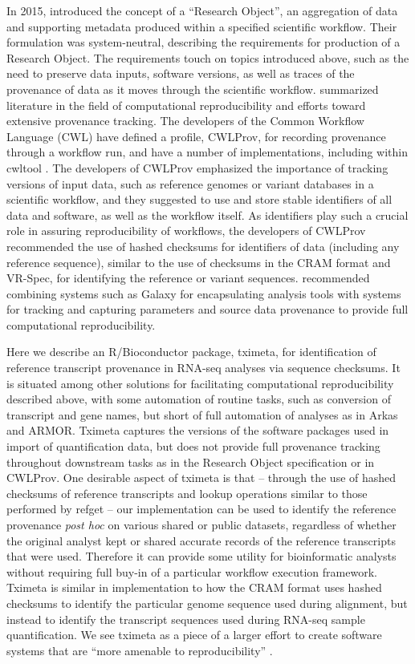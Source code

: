 \documentclass[12pt]{article} \usepackage[utf8]{inputenc}
\begin{document}
In 2015, \citet{Belhajjame2015} introduced the concept of a ``Research
Object'', an aggregation of data and supporting metadata produced
within a specified scientific workflow. Their formulation was
system-neutral, describing the requirements for production of a
Research Object. The requirements touch on topics introduced above,
such as the need to preserve data inputs, software versions, as well
as traces of the provenance of data as it moves through the scientific
workflow. \citet{Belhajjame2015} summarized literature in the field of
computational reproducibility and efforts toward extensive provenance
tracking. The developers of the Common Workflow Language (CWL) \citep{cwl}
have defined a profile, CWLProv, for recording provenance through a
workflow run, and have a number of implementations, including within
cwltool \citep{Khan2018}. The developers of CWLProv emphasized the
importance of tracking versions of input data, such as reference
genomes or variant databases in a scientific workflow, and they
suggested to use and store stable identifiers of all data and software,
as well as the workflow itself. As identifiers play such a crucial
role in assuring reproducibility of workflows, the developers of
CWLProv recommended the use of hashed checksums for identifiers of data
(including any reference sequence), similar to the use of checksums in
the CRAM format and VR-Spec, for identifying the reference or variant
sequences. \citet{Gruning2018} recommended combining systems such as
Galaxy for encapsulating analysis tools with systems for tracking and
capturing parameters and source data provenance to provide full
computational reproducibility.

Here we describe an R/Bioconductor package, tximeta, for identification
of reference transcript provenance in RNA-seq analyses via sequence
checksums. It is situated among other solutions for facilitating
computational reproducibility described above, with some automation of
routine tasks, such as conversion of transcript and gene names, but
short of full automation of analyses as in Arkas and ARMOR. Tximeta
captures the versions of the software packages used in import of
quantification data, but does not provide full provenance tracking
throughout downstream tasks as in the Research Object specification or
in CWLProv. One desirable aspect of tximeta is that -- through the use
of hashed checksums of reference transcripts and lookup operations
similar to those performed by refget -- our implementation can be used
to identify the reference provenance \textit{post hoc} on various
shared or public datasets, regardless of whether the original analyst
kept or shared accurate records of the reference transcripts that were
used. Therefore it can provide some utility for bioinformatic analysts
without requiring full buy-in of a particular workflow execution
framework. Tximeta is similar in implementation to how the CRAM format
uses hashed checksums to identify the particular genome sequence used
during alignment, but instead to identify the transcript sequences used during
RNA-seq sample quantification. We see tximeta as a piece of a larger
effort to create software systems that are ``more amenable to
reproducibility'' \citep{Peng2011}.
\end{document}
